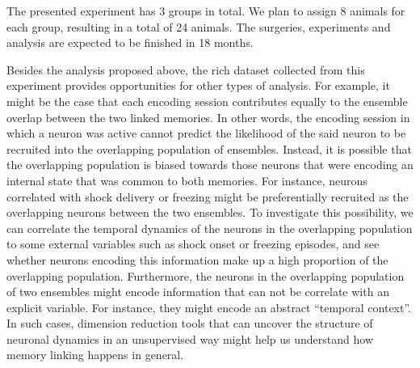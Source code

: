 \documentclass[master.tex]{subfiles}
\begin{document}
The presented experiment has 3 groups in total. We plan to assign 8 animals for
each group, resulting in a total of 24 animals. The surgeries, experiments and
analysis are expected to be finished in 18 months.

Besides the analysis proposed above, the rich dataset collected from this
experiment provides opportunities for other types of analysis. For example, it
might be the case that each encoding session contributes equally to the ensemble
overlap between the two linked memories. In other words, the encoding session in
which a neuron was active cannot predict the likelihood of the said neuron to be
recruited into the overlapping population of ensembles. Instead, it is possible
that the overlapping population is biased towards those neurons that were
encoding an internal state that was common to both memories. For instance,
neurons correlated with shock delivery or freezing might be preferentially
recruited as the overlapping neurons between the two ensembles. To investigate
this possibility, we can correlate the temporal dynamics of the neurons in the
overlapping population to some external variables such as shock onset or
freezing episodes, and see whether neurons encoding this information make up a
high proportion of the overlapping population. Furthermore, the neurons in the
overlapping population of two ensembles might encode information that can not be
correlate with an explicit variable. For instance, they might encode an abstract
``temporal context''. In such cases, dimension reduction tools that can uncover
the structure of neuronal dynamics in an unsupervised way might help us
understand how memory linking happens in general.
\end{document}
